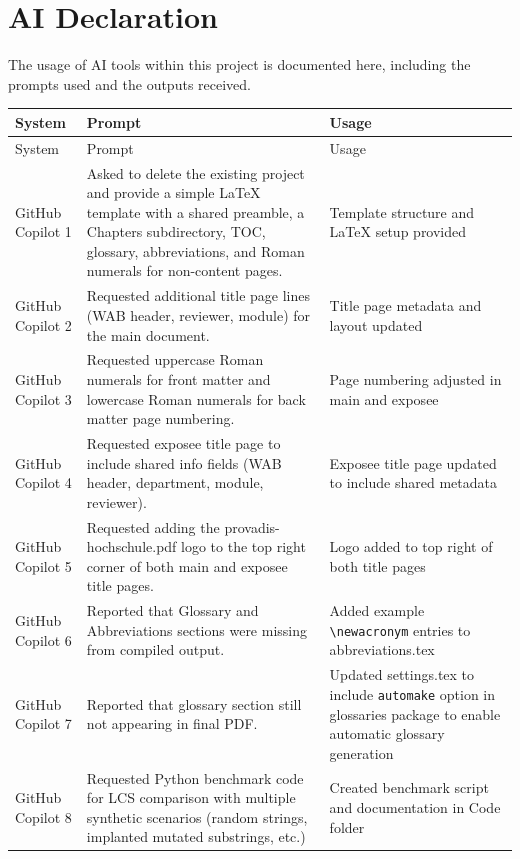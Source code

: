 \chapter*{AI Declaration}

The usage of AI tools within this project is documented here, including the prompts used and the outputs received.

\renewcommand{\arraystretch}{1.5}
{\footnotesize
\begin{longtable}{p{} p{} p{}}
    \toprule
    System & Prompt & Usage \\
    \midrule
    \endfirsthead
    \toprule
    System & Prompt & Usage \\
    \midrule
    \endhead
    \midrule
    \endfoot
    \bottomrule
    \endlastfoot
    GitHub Copilot 1 & Asked to delete the existing project and provide a simple LaTeX template with a shared preamble, a Chapters subdirectory, TOC, glossary, abbreviations, and Roman numerals for non-content pages. & Template structure and LaTeX setup provided \\
    GitHub Copilot 2 & Requested additional title page lines (WAB header, reviewer, module) for the main document. & Title page metadata and layout updated \\
    GitHub Copilot 3 & Requested uppercase Roman numerals for front matter and lowercase Roman numerals for back matter page numbering. & Page numbering adjusted in main and exposee \\
    GitHub Copilot 4 & Requested exposee title page to include shared info fields (WAB header, department, module, reviewer). & Exposee title page updated to include shared metadata \\
    GitHub Copilot 5 & Requested adding the provadis-hochschule.pdf logo to the top right corner of both main and exposee title pages. & Logo added to top right of both title pages \\
    GitHub Copilot 6 & Reported that Glossary and Abbreviations sections were missing from compiled output. & Added example \texttt{\textbackslash newacronym} entries to abbreviations.tex\\
    GitHub Copilot 7 & Reported that glossary section still not appearing in final PDF. & Updated settings.tex to include \texttt{automake} option in glossaries package to enable automatic glossary generation \\
    GitHub Copilot 8 & Requested Python benchmark code for LCS comparison with multiple synthetic scenarios (random strings, implanted mutated substrings, etc.) & Created benchmark script and documentation in Code folder \\

\end{longtable}}
